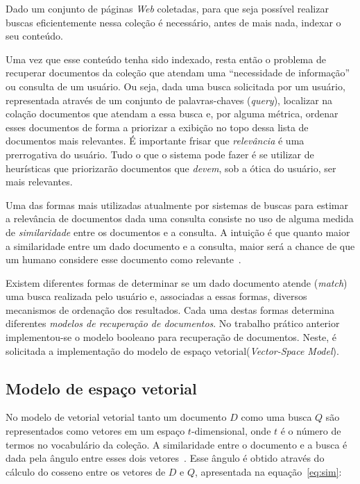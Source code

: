 \documentclass[10pt,twocolumn]{article}
\begin{document}
Dado um conjunto de páginas \emph{Web} coletadas, para que seja possível
realizar buscas eficientemente nessa coleção é necessário, antes de mais
nada, indexar o seu conteúdo.

Uma vez que esse conteúdo tenha sido indexado, resta então o problema
de recuperar documentos da coleção que atendam uma ``necessidade de
informação'' ou consulta de um usuário. Ou seja, dada uma busca solicitada por um
usuário, representada através de um
conjunto de palavras-chaves (\emph{query}), localizar na colação
documentos que atendam a essa busca e, por alguma métrica, ordenar esses
documentos de forma a priorizar a exibição no topo dessa lista de
documentos mais relevantes. É importante frisar que
\emph{relevância} é uma prerrogativa do usuário. Tudo o que o sistema
pode fazer é se utilizar de heurísticas que priorizarão documentos que
\emph{devem}, sob a ótica do usuário, ser mais relevantes.

Uma das formas mais utilizadas atualmente por sistemas de buscas para
estimar a relevância de documentos dada uma consulta consiste no uso de
alguma medida de \emph{similaridade} entre os documentos e a consulta. A
intuição é que quanto maior a similaridade entre um dado documento e a
consulta, maior será a chance de que um humano considere esse documento
como relevante~\cite{moffat2006survey}.

Existem diferentes formas de determinar se um dado documento
atende (\emph{match}) uma busca  realizada pelo usuário e, associadas a
essas formas, diversos mecanismos de ordenação dos resultados. Cada uma
destas formas determina diferentes \emph{modelos de recuperação de
documentos}. No trabalho prático anterior implementou-se o modelo
booleano para recuperação de documentos. Neste, é solicitada a
implementação do modelo de espaço vetorial(\emph{Vector-Space Model}).

\subsection{Modelo de espaço vetorial}

No modelo de vetorial vetorial tanto um documento \(D\) como uma busca
\(Q\) são representados como vetores em um espaço \(t\)-dimensional,
onde \(t\) é o número de termos no vocabulário da coleção. A
similaridade entre o documento e a busca é dada pela ângulo entre esses
dois vetores~\cite{berthier1999modern}.
Esse ângulo é obtido através do cálculo do cosseno entre
os vetores de \(D\) e \(Q\), apresentada na equação~\ref{eq:sim}:
\end{document}
